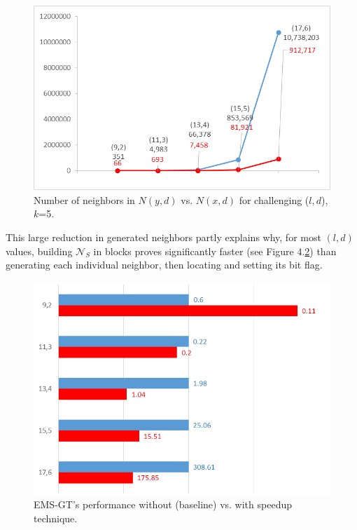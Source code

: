 \documentclass[oneside,12pt]{DISCSthesis}
\begin{document}
{%
		\begin{figure}[h]\label{fig:nxd_vs_nyd}
			\centering
			\includegraphics{img/nbrhd_growth_compare.png}
			\caption{Number of neighbors in $N(y,d)$ vs. $N(x,d)$ for challenging ($l,d$), $k$=5.}
			\end{figure}

		\noindent This large reduction in generated neighbors partly explains why, for most $(l,d)$ values, building $\mathcal{N}_S$ in blocks proves significantly faster (see Figure 4.\ref{fig:results1}) than generating each individual neighbor, then locating and setting its bit flag. 

		\newpage
		\begin{figure}[ht]\label{fig:results1}
			\centering
			\includegraphics[width=5.0in]{img/results1.png}
			\caption{EMS-GT's performance without (baseline) vs. with speedup technique.}
			\end{figure}

}
\end{document}
